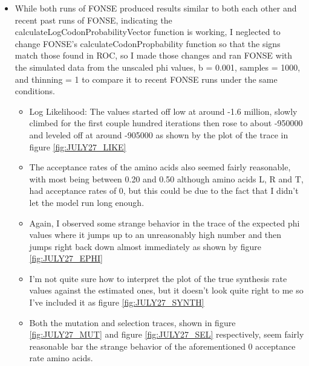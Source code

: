 \documentclass[11pt]{labbook}
\begin{document}
    \begin{itemize}
        \item While both runs of FONSE produced results similar to both each other and recent past runs of FONSE, indicating the calculateLogCodonProbabilityVector function is working, I neglected to change FONSE's calculateCodonPropbability function so that the signs match those found in ROC, so I made those changes and ran FONSE with the simulated data from the unscaled phi values, b = 0.001, samples = 1000, and thinning = 1 to compare it to recent FONSE runs under the same conditions.
            \begin{itemize}
                \item Log Likelihood: The values started off low at around -1.6 million, slowly climbed for the first couple hundred iterations then rose to about -950000 and leveled off at around -905000 as shown by the plot of the trace in figure \ref{fig:JULY27_LIKE}
                \item The acceptance rates of the amino acids also seemed fairly reasonable, with most being between 0.20 and 0.50 although amino acids L, R and T, had acceptance rates of 0, but this could be due to the fact that I didn't let the model run long enough.
                \item Again, I observed some strange behavior in the trace of the expected phi values where it jumps up to an unreasonably high number and then jumps right back down almost immediately as shown by figure \ref{fig:JULY27_EPHI}
                \item I'm not quite sure how to interpret the plot of the true synthesis rate values against the estimated ones, but it doesn't look quite right to me so I've included it as figure \ref{fig:JULY27_SYNTH}
                \item Both the mutation and selection traces, shown in figure \ref{fig:JULY27_MUT} and figure \ref{fig:JULY27_SEL} respectively, seem fairly reasonable bar the strange behavior of the aforementioned 0 acceptance rate amino acids. 
            \end{itemize}
    \end{itemize}
    
\end{document}
